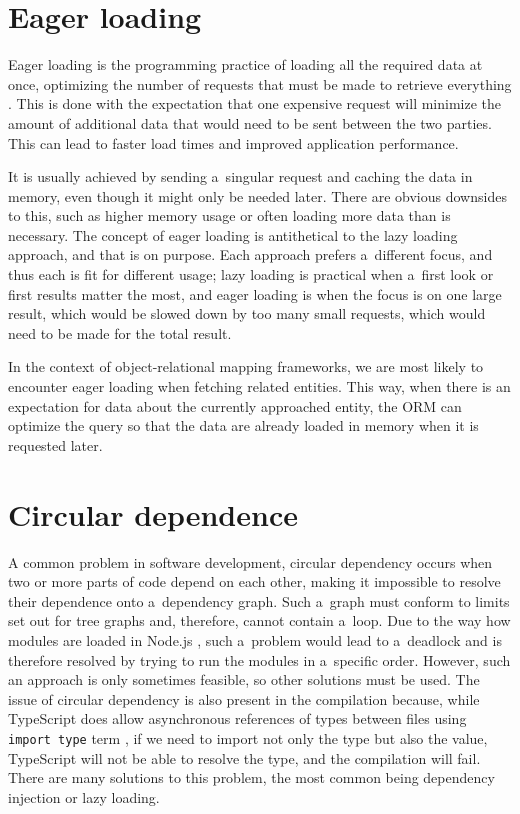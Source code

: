 \section*{Eager loading}
Eager loading is the programming practice of loading all the required data at
once, optimizing the number of requests that must be made to retrieve everything
\cite{sequelize-eager-loading}. This is done with the expectation that one
expensive request will minimize the amount of additional data that would need to
be sent between the two parties. This can lead to faster load times and improved
application performance.

It is usually achieved by sending a~singular request and caching the data in
memory, even though it might only be needed later. There are obvious downsides
to this, such as higher memory usage or often loading more data than is
necessary. The concept of eager loading is antithetical to the lazy loading
approach, and that is on purpose. Each approach prefers a~different focus, and
thus each is fit for different usage; lazy loading is practical when a~first
look or first results matter the most, and eager loading is when the focus is on
one large result, which would be slowed down by too many small requests, which
would need to be made for the total result.

In the context of object-relational mapping frameworks, we are most likely to
encounter eager loading when fetching related entities. This way, when there is
an expectation for data about the currently approached entity, the ORM can
optimize the query so that the data are already loaded in memory when it is
requested later.


\section*{Circular dependence}
A common problem in software development, circular dependency occurs when two or
more parts of code depend on each other, making it impossible to resolve their
dependence onto a~dependency graph. Such a~graph must conform to limits set out
for tree graphs and, therefore, cannot contain a~loop. Due to the way how
modules are loaded in Node.js \cite{commonjsModulesNode}, such a~problem would
lead to a~deadlock and is therefore resolved by trying to run the modules in
a~specific order. However, such an approach is only sometimes feasible, so other
solutions must be used. The issue of circular dependency is also present in the
compilation because, while TypeScript does allow asynchronous references of
types between files using \texttt{import type} term \cite{typescript-modules},
if we need to import not only the type but also the value, TypeScript will not
be able to resolve the type, and the compilation will fail. There are many
solutions to this problem, the most common being dependency injection or lazy
loading.

